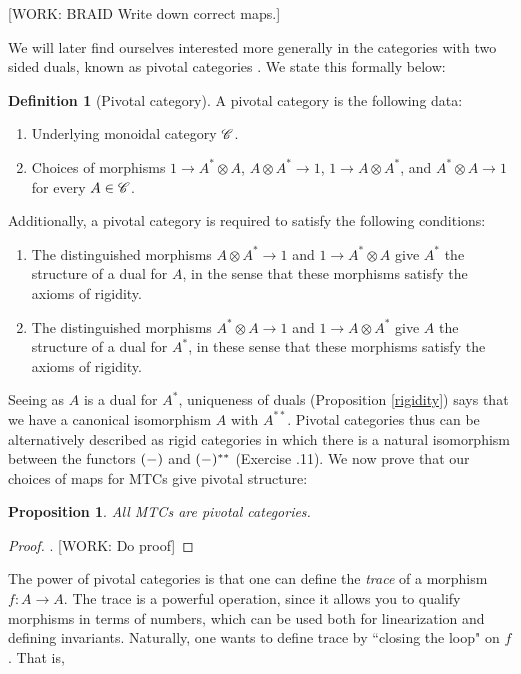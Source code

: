 \documentclass{article}
\newtheorem{proposition}{Proposition}[section]
\theoremstyle{definition}
\newtheorem*{definition}{Definition}
\numberwithin{figure}{section}
\begin{document}
[WORK: BRAID Write down correct maps.]

We will later find ourselves interested more generally in the categories with two sided duals, known as pivotal categories \cite{selinger2011survey}. We state this formally below:

\begin{definition}[Pivotal category] A pivotal category is the following data:

\begin{enumerate}
\item Underlying monoidal category $\mathscr{C}$.
\item Choices of morphisms $1\to A^{*}\otimes A$, $A\otimes A^{*}\to 1$, $1\to A\otimes A^{*}$, and $A^{*}\otimes A\to 1$ for every $A\in \mathscr{C}$.
\end{enumerate}

Additionally, a pivotal category is required to satisfy the following conditions:

\begin{enumerate}
\item The distinguished morphisms $A\otimes A^{*}\to 1$ and $1\to A^{*}\otimes A$ give $A^{*}$ the structure of a dual for $A$, in the sense that these morphisms satisfy the axioms of rigidity.

\item The distinguished morphisms $A^{*}\otimes A\to 1$ and $1\to A\otimes A^{*}$ give $A$ the structure of a dual for $A^{*}$, in these sense that these morphisms satisfy the axioms of rigidity.
\end{enumerate}

\raggedleft\qedsymbol{}
\end{definition}

Seeing as $A$ is a dual for $A^{*}$, uniqueness of duals (Proposition \ref{rigidity}) says that we have a canonical isomorphism $A$ with $A^{**}$. Pivotal categories thus can be alternatively described as rigid categories in which there is a natural isomorphism between the functors $(\--)$ and $(\--)^{**}$ (Exercise \thesection.11). We now prove that our choices of maps for MTCs give pivotal structure:

\begin{proposition} All MTCs are pivotal categories.
\end{proposition}
\begin{proof}. [WORK: Do proof]
\end{proof}

The power of pivotal categories is that one can define the \textit{trace} of a morphism $f:A \to A$. The trace is a powerful operation, since it allows you to qualify morphisms in terms of numbers, which can be used both for linearization and defining invariants. Naturally, one wants to define trace by ``closing the loop" on $f$. That is,
\end{document}
